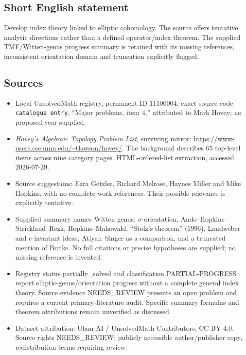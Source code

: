 \documentclass[11pt]{article}
\begin{document}
\subsection{Short English statement}
Develop index theory linked to elliptic cohomology. The source offers tentative analytic directions rather than a defined operator/index theorem. The supplied TMF/Witten-genus progress summary is retained with its missing references, inconsistent orientation domain and truncation explicitly flagged.
\subsection{Sources}
\begin{itemize}
\item Local UnsolvedMath registry, permanent ID \(11100004\), exact source code \texttt{catalogue entry}, ``Major problems, item 4,'' attributed to Mark Hovey; no proposed year supplied.
\item \emph{Hovey's Algebraic Topology Problem List}, surviving mirror: \url{https://www-users.cse.umn.edu/~tlawson/hovey/}. The background describes 65 top-level items across nine category pages. HTML-ordered-list extraction, accessed 2026-07-29.
\item Source suggestions: Ezra Getzler, Richard Melrose, Haynes Miller and Mike Hopkins, with no complete work references. Their possible relevance is explicitly tentative.
\item Supplied summary names Witten genus, \(\sigma\)-orientation, Ando--Hopkins--Strickland--Rezk, Hopkins--Mahowald, ``Stolz's theorem'' (1996), Landweber and \(e\)-invariant ideas, Atiyah--Singer as a comparison, and a truncated mention of Bunke. No full citations or precise hypotheses are supplied; no missing reference is invented.
\item Registry status partially\_solved and classification PARTIAL-PROGRESS report elliptic-genus/orientation progress without a complete general index theory. Source evidence NEEDS\_REVIEW presents an open problem and requires a current primary-literature audit. Specific summary formulas and theorem attributions remain unverified as discussed.
\item Dataset attribution: Ulam AI / UnsolvedMath Contributors, CC BY 4.0. Source rights NEEDS\_REVIEW: publicly accessible author/publisher copy, redistribution terms requiring review.
\end{itemize}
\end{document}
